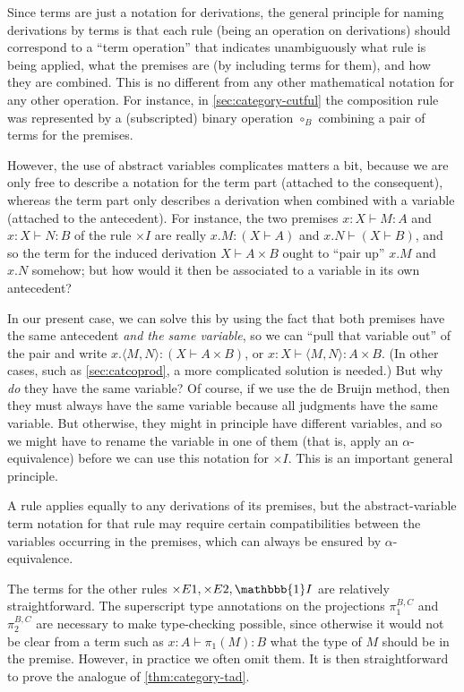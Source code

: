 \documentclass{book}
\let\types\vdash
\def\unit{\mathbbb{1}}%
\def\timesE{\ensuremath{\mathord{\times}E}}
\def\timesI{\ensuremath{\mathord{\times}I}}
\def\pair#1#2{\langle #1,#2\rangle}
\def\pr#1#2#3{\pi_{#1}^{#2,#3}}
\begin{document}
Since terms are just a notation for derivations, the general principle for naming derivations by terms is that each rule (being an operation on derivations) should correspond to a ``term operation'' that indicates unambiguously what rule is being applied, what the premises are (by including terms for them), and how they are combined.
This is no different from any other mathematical notation for any other operation.
For instance, in \cref{sec:category-cutful} the composition rule was represented by a (subscripted) binary operation $\circ_B$ combining a pair of terms for the premises.

However, the use of abstract variables complicates matters a bit, because we are only free to describe a notation for the term part (attached to the consequent), whereas the term part only describes a derivation when combined with a variable (attached to the antecedent).
For instance, the two premises $x:X\types M:A$ and $x:X\types N:B$ of the rule $\timesI$ are really $x.M:(X\types A)$ and $x.N\types (X\types B)$, and so the term for the induced derivation $X\types A\times B$ ought to ``pair up'' $x.M$ and $x.N$ somehow; but how would it then be associated to a variable in its own antecedent?

In our present case, we can solve this by using the fact that both premises have the same antecedent \emph{and the same variable}, so we can ``pull that variable out'' of the pair and write $x.\pair M N : (X\types A\times B)$, or $x:X\types \pair M N :A\times B$.
(In other cases, such as \cref{sec:catcoprod}, a more complicated solution is needed.)
But why \emph{do} they have the same variable?
Of course, if we use the de Bruijn method, then they must always have the same variable because all judgments have the same variable.
But otherwise, they might in principle have different variables, and so we might have to rename the variable in one of them (that is, apply an $\alpha$-equivalence) before we can use this notation for $\timesI$.
This is an important general principle.

\begin{princ}\label{princ:term-der-alpha}
  A rule applies equally to any derivations of its premises, but the abstract-variable term notation for that rule may require certain compatibilities between the variables occurring in the premises, which can always be ensured by $\alpha$-equivalence.
\end{princ}

The terms for the other rules $\timesE1,\timesE2,\unit I$ are relatively straightforward.
The superscript type annotations on the projections $\pr1BC$ and $\pr2BC$ are necessary to make type-checking possible, since otherwise it would not be clear from a term such as $x:A \types \pi_1(M):B$ what the type of $M$ should be in the premise.
However, in practice we often omit them.
It is then straightforward to prove the analogue of \cref{thm:category-tad}.
\end{document}
